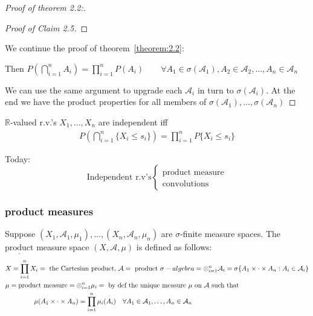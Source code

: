 \documentclass[11pt]{article}
\begin{document}
\begin{proof}[Proof of theorem 2.2:]
\begin{claim}
\begin{proof}[Proof of Claim 2.5]
        \end{proof}
    \end{claim}
    We continue the proof of theorem~\ref{theorem:2.2}:

    Then $P(\bigcap _{i=1}^{n} A_i) = \prod_{i=1}^{n} P(A_{i}) \qquad \forall 
     A_1 \in \sigma(\mathcal{A}_1), A_2 \in \mathcal{A}_{2}, \ldots ,A_n \in \mathcal{A}_{n}$

     We can use the same argument to upgrade each $\mathcal{A}_i$ in turn to $\sigma(\mathcal{A}_{i})$.
     At the end we have the product properties for all members of $\sigma(\mathcal{A}_{1}), \ldots ,
     \sigma(\mathcal{A}_{n})$
\end{proof}

\begin{corollary}
    $\mathbb{R}$-valued r.v.'s $X_1, \ldots ,X_n$ are independent iff 
    \begin{align*}
        P(\bigcap _{i=1}^{n}\{ X_{i} \le s_i \}) = \prod_{i=1}^{n}P\{ X_{i} \le s_i \} 
    \end{align*}
\end{corollary}


Today:
\begin{equation*}
    \text{Independent r.v's}
    \begin{cases} 
    \text{product measure}\\ 
    \text{convolutions}   
    \end{cases}
\end{equation*}

\subsubsection{product measures}
\begin{definition}
    Suppose $(X_1, \mathcal{A}_1, \mu_1), \ldots ,(X_n,\mathcal{A}_n,\mu_n)$ are $\sigma$-finite measure spaces.
    The $\underline{\text{product}}$ measure space $(X,\mathcal{A},\mu)$ is defined as follows:
    \begin{align*}
        &X = \prod_{i=1}^{n} X_{i} = \text{ the Cartesian product, } \mathcal{A} = \text{ product }\sigma-algebra
        = \otimes_{i=1}^{n}\mathcal{A}_i = \sigma \{ A_1\times \cdot \times A_n: A_i \in \mathcal{A}_i \}\\
        &\mu = \text{product measure} = \otimes_{i=1}^{n}\mu_i = \text{ by def the unique measure }\mu \text{ on }
        \mathcal{A} \text{ such that }\\
        &\hspace*{15mm} \mu(A_1 \times \cdot  \times A_n) = \prod_{i=1}^{n}\mu_i(A_i) 
        \quad \forall A_1 \in \mathcal{A}_1, \ldots ,
        A_n \in \mathcal{A}_n 
    \end{align*}
\end{definition}
\end{document}
